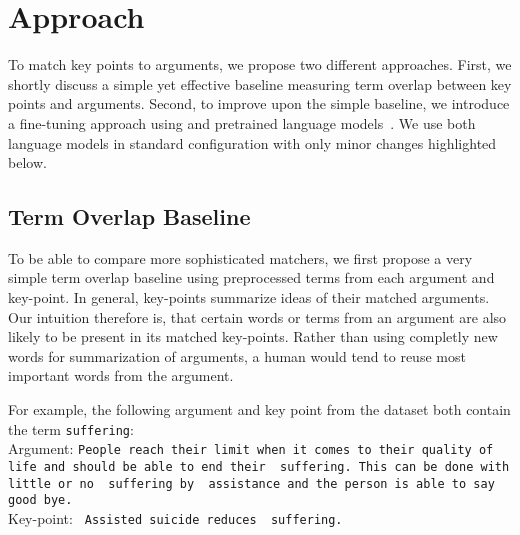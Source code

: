 \section{Approach}\label{approach}

To match key points to arguments, we propose two different approaches.
First, we shortly discuss a simple yet effective baseline measuring term overlap between key points and arguments.
Second, to improve upon the simple baseline, we introduce a fine-tuning approach using \Bert and \Roberta pretrained language models~\cite{DevlinCLT2019,LiuOGDJCLLZS2019}. We use both language models in standard configuration with only minor changes highlighted below.

\subsection{Term Overlap Baseline}
To be able to compare more sophisticated matchers, we first propose a very simple term overlap baseline using preprocessed terms from each argument and key-point. 
In general, key-points summarize ideas of their matched arguments.
Our intuition therefore is, that certain words or terms from an argument are also likely to be present in its matched key-points.
Rather than using completly new words for summarization of arguments, a human would tend to reuse most important words from the argument.

For example, the following argument and key point from the \ArgKP dataset both contain the term \texttt{suffering}: \\
Argument: \texttt{People reach their limit when it comes to their quality of life and should be able to end their {\color{blue} suffering}. This can be done with little or no {\color{blue} suffering} by {\color{orange} assistance} and the person is able to say good bye.} \\
Key-point: \texttt{{\color{orange} Assisted} suicide reduces {\color{blue} suffering}.}

